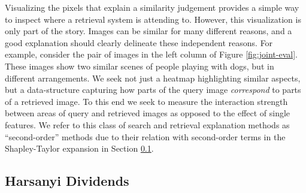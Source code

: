 \documentclass{article} %
\begin{document}
Visualizing the pixels that explain a similarity judgement provides a simple way to inspect where a retrieval system is attending to. However, this visualization is only part of the story. Images can be similar for many different reasons, and a good explanation should clearly delineate these independent reasons. For example, consider the pair of images in the left column of Figure \ref{fig:joint-eval}. These images show two similar scenes of people playing with dogs, but in different arrangements. We seek not just a heatmap highlighting similar aspects, but a data-structure capturing how parts of the query image \textit{correspond} to parts of a retrieved image. To this end we seek to measure the interaction strength between areas of query and retrieved images as opposed to the effect of single features. We refer to this class of search and retrieval explanation methods as ``second-order'' methods due to their relation with second-order terms in the Shapley-Taylor expansion in Section \ref{sec:hd}. 

\vspace{-.1in}
\subsection{Harsanyi Dividends}
\label{sec:hd}
\vspace{-.1in}
\end{document}

